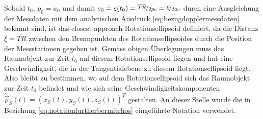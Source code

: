\documentclass[a4paper,12pt]{article}
\numberwithin{equation}{section}
\begin{document}
Sobald $t_0$, $p_0=a_0$ und damit $e_0 \doteq e(t_0) = \nicefrac{\overline{TR}}{2p_0} = \nicefrac{\xi}{2a_0}$ durch eine Ausgleichung der Messdaten mit dem analytischen Ausdruck \eqref{eq:bezugdopplermessdaten} bekannt sind, ist das \flqq closest-approach\frqq-Rotationsellipsoid definiert, da die Distanz $\xi = \overline{TR}$ zwischen den Brennpunkten des Rotationsellipsoides durch die Position der Messstationen gegeben ist. Gemäss obigen Überlegungen muss das Raumobjekt zur Zeit $t_0$ auf diesem Rotationsellipsoid liegen und hat eine Geschwindigkeit, die in der Tangentialebene zu diesem Rotationsellipsoid liegt. Also bleibt zu bestimmen, wo auf dem Rotationsellipsoid sich das Raumobjekt zur Zeit $t_0$ befindet und wie sich seine Geschwindigkeitskomponenten $\dot{\vec{\rho}}_S(t) = (\dot{x}_S(t),\dot{y}_S(t),\dot{z}_S(t))^T$ gestalten. An dieser Stelle wurde die in Beziehung \eqref{eq:notationfurtherbermitrhos} eingeführte Notation verwendet.
\end{document}
